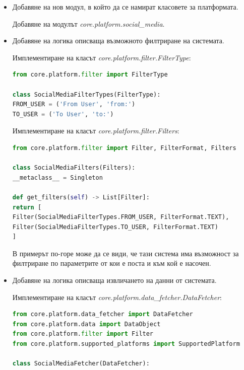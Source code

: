 \documentclass{article}
\begin{document}
\begin{itemize}
\item Добавяне на нов модул, в който да се намират класовете за платформата.

Добавяне на модулът \textit{core.platform.social\_media}.

\item Добавяне на логика описваща възможното филтриране на системата.

Имплементиране на класът \textit{core.platform.filter.FilterType}:

\begin{lstlisting}[language=Python, caption=Дефиниция на типовете филтри на новата социална мрежа.]
from core.platform.filter import FilterType

class SocialMediaFilterTypes(FilterType):
FROM_USER = ('From User', 'from:')
TO_USER = ('To User', 'to:')
\end{lstlisting}

Имплементиране на класът \textit{core.platform.filter.Filters}:

\begin{lstlisting}[language=Python, caption=Дефиниция на подържаните филтри от новата социална мрежа.]
from core.platform.filter import Filter, FilterFormat, Filters

class SocialMediaFilters(Filters):
__metaclass__ = Singleton

def get_filters(self) -> List[Filter]:
return [
Filter(SocialMediaFilterTypes.FROM_USER, FilterFormat.TEXT),
Filter(SocialMediaFilterTypes.TO_USER, FilterFormat.TEXT)
]
\end{lstlisting}

В примерът по-горе може да се види, че тази система има възможност за филтриране по параметрите от кои е поста и
към кой е насочен.

\item Добавяне на логика описваща извличането на данни от системата.

Имплементиране на класът \textit{core.platform.data\_fetcher.DataFetcher}:

\begin{lstlisting}[language=Python, caption=Дефиниция на извличането на данни от новата социална мрежа.]
from core.platform.data_fetcher import DataFetcher
from core.platform.data import DataObject
from core.platform.filter import Filter
from core.platform.supported_platforms import SupportedPlatform

class SocialMediaFetcher(DataFetcher):


\end{lstlisting}
\end{itemize}
\end{document}
